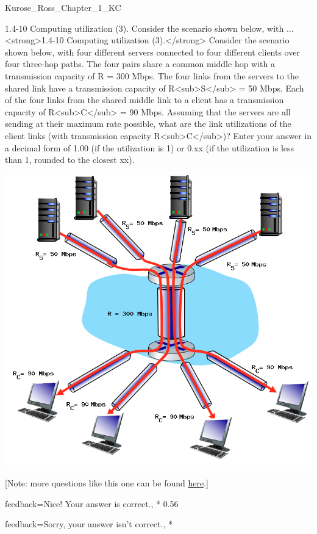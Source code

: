 \documentclass[a4paper]{article}
\begin{document}
\begin{quiz}{Kurose_Ross_Chapter_1_KC}
\begin{shortanswer}[
	points=1,
	penalty=0.33333,
]{1.4-10 Computing utilization (3). Consider the scenario shown below, with ...}
<strong>1.4-10 Computing utilization (3).</strong> Consider the scenario shown below, with four different servers connected to four different clients over four three-hop paths. The four pairs share a common middle hop with a transmission capacity of R = 300 Mbps. The four links from the servers to the shared link have a transmission capacity of R<sub>S</sub> = 50 Mbps. Each of the four links from the shared middle link to a client has a transmission capacity of R<sub>C</sub> = 90 Mbps. Assuming that the servers are all sending at their maximum rate possible, what are the link utilizations of the client links (with transmission capacity R<sub>C</sub>)? Enter your answer in a decimal form of 1.00 (if the utilization is 1) or 0.xx (if the utilization is less than 1, rounded to the closest xx). 
\begin{center}
\includegraphics[width=\linewidth]{figs/1.4.7.png}
\end{center}
 [Note: more questions like this one can be found \href{http://gaia.cs.umass.edu/kurose_ross/interactive/end-end-throughput-simple.php}{here}.]
\item[feedback={Nice!  Your answer is correct.},]* 0.56
\item[feedback={Sorry, your answer isn't correct.},] *
\end{shortanswer}

\end{quiz}
\end{document}
